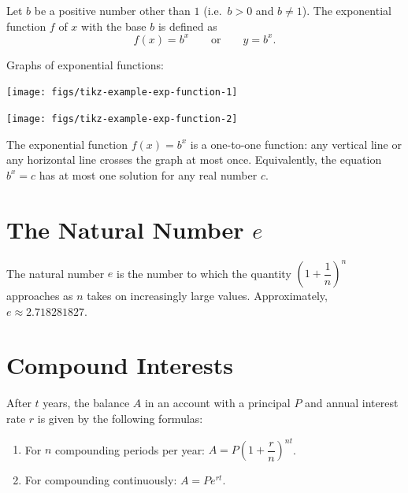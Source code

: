 \documentclass[
  en,11pt]{elegantbook}
\providecommand{\tightlist}{%
  \setlength{\itemsep}{0pt}\setlength{\parskip}{0pt}}
\newcommand{\size}[2]{{\fontsize{#1}{0}\selectfont#2}}
\newenvironment{rmdnote}{
	\vspace*{0.5\baselineskip}
    \par\noindent
    \makebox[-3pt][r]{\color{red!90}\size{8}{\textdbend}\,\,}
    \begin{tcolorbox}[
    title={\textbf{\color{second}Note}},
    title style={left color=blue!10!green!20!white,right color=yellow!20!blue!20!white},
    colback=red!10!white,
    ]
    \itshape
}{
    \end{tcolorbox}
    \par\ignorespacesafterend
}
\begin{document}
Let \(b\) be a positive number other than \(1\) (i.e.~\(b>0\) and \(b\neq 1\)). The exponential function \(f\) of \(x\) with the base \(b\) is defined as
\[
f(x)=b^x\quad\quad\text{or}\quad\quad y=b^x.
\]

Graphs of exponential functions:

\begin{multicols}{2}

\begin{center}\texttt{[image: figs/tikz-example-exp-function-1]} \end{center}

\begin{center}\texttt{[image: figs/tikz-example-exp-function-2]} \end{center}

\end{multicols}

\begin{rmdnote}

The exponential function \(f(x)=b^x\) is a one-to-one function: any vertical line or any horizontal line crosses the graph at most once. Equivalently, the equation \(b^x=c\) has at most one solution for any real number \(c\).

\end{rmdnote}

\hypertarget{the-natural-number-e}{%
\section{\texorpdfstring{The Natural Number \(e\)}{The Natural Number e}}\label{the-natural-number-e}}

The natural number \(e\) is the number to which the quantity \(\left(1+\dfrac1n\right)^n\) approaches as \(n\) takes on increasingly large values. Approximately, \(e\approx2.718281827\).

\hypertarget{compound-interests}{%
\section{Compound Interests}\label{compound-interests}}

After \(t\) years, the balance \(A\) in an account with a principal \(P\) and annual interest rate \(r\) is given by the following formulas:

\begin{enumerate}
\def\labelenumi{\arabic{enumi}.}
\tightlist
\item
  For \(n\) compounding periods per year: \(A=P\left(1+\dfrac{r}{n}\right)^{nt}\).
\item
  For compounding continuously: \(A=Pe^{rt}\).
\end{enumerate}
\end{document}
